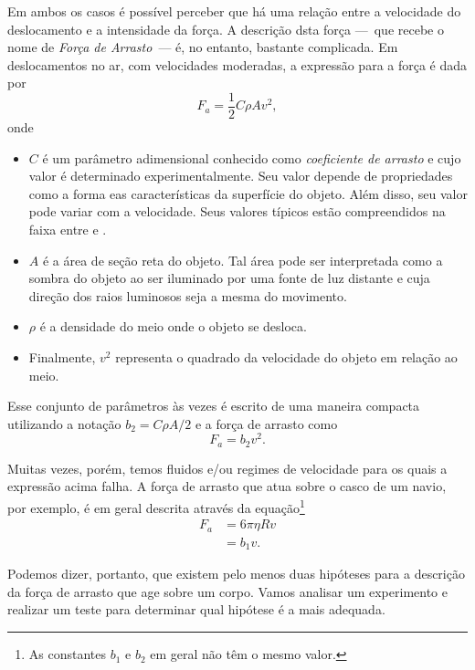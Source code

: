 Em ambos os casos é possível perceber que há uma relação entre a velocidade do deslocamento e a intensidade da força. A descrição dsta força ---~que recebe o nome de \emph{Força de Arrasto}~--- é, no entanto, bastante complicada. Em deslocamentos no ar, com velocidades moderadas, a expressão para a força é dada por
\begin{equation}
	F_a = \frac{1}{2} C\rho A v^2,
\end{equation}
%
onde
\begin{itemize}
	\item $C$ é um parâmetro adimensional conhecido como \emph{coeficiente de arrasto} e cujo valor é determinado experimentalmente. Seu valor depende de propriedades como a forma eas características da superfície do objeto. Além disso, seu valor pode variar com a velocidade. Seus valores típicos estão compreendidos na faixa entre  e .
	\item $A$ é a área de seção reta do objeto. Tal área pode ser interpretada como a sombra do objeto ao ser iluminado por uma fonte de luz distante e cuja direção dos raios luminosos seja a mesma do movimento.
	\item $\rho$ é a densidade do meio onde o objeto se desloca.
	\item Finalmente, $v^2$ representa o quadrado da velocidade do objeto em relação ao meio.
\end{itemize}

\pagebreak

Esse conjunto de parâmetros às vezes é escrito de uma maneira compacta utilizando a notação $b_2 = C\rho A /2$ e a força de arrasto como
\begin{equation}
	F_a = b_2 v^2.
\end{equation}

Muitas vezes, porém, temos fluidos e/ou regimes de velocidade para os quais a expressão acima falha. A força de arrasto que atua sobre o casco de um navio, por exemplo, é em geral descrita através da equação\footnote{As constantes $b_1$ e $b_2$ em geral não têm o mesmo valor.}
\begin{align}
	F_a &= 6\pi\eta R v \\
	&= b_1 v.
\end{align}

Podemos dizer, portanto, que existem pelo menos duas hipóteses para a descrição da força de arrasto que age sobre um corpo. Vamos analisar um experimento e realizar um teste para determinar qual hipótese é a mais adequada.

